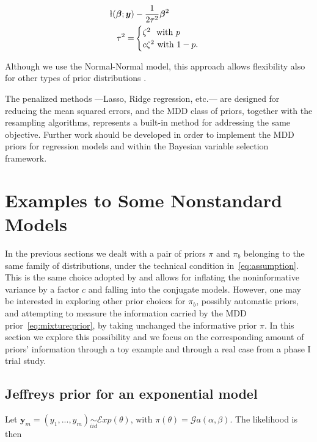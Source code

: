 \documentclass{statsoc}
\begin{document}
\begin{align}
\l(\bm{\beta}; \bm{y})& -\frac{1}{2\tau^{2}}\bm{\beta}^{2}\\
 \tau^{2}=&\begin{cases}
\zeta^{2} \ \  \mbox{with } p \\
c\zeta^{2}  \ \mbox{with } 1-p.
\end{cases}
\label{eq:penalized_hierarchical2}
\end{align}

Although we use the Normal-Normal model, this approach allows flexibility also for other types of prior distributions \citep{wood2017generalized}.

The penalized methods ---Lasso, Ridge regression, etc.--- are designed for reducing the mean squared errors, and the MDD class of priors, together with the resampling algorithms, represents a built-in method for addressing the same objective. Further work should be developed in order to implement the MDD priors for regression models and within the Bayesian variable selection framework.



\section{Examples to Some Nonstandard Models}
\label{sec:case}

In the previous sections we dealt with a pair of priors $\pi$ and $\pi_{b}$ belonging to the same family of distributions, under the technical condition in~\eqref{eq:assumption}. This is the same choice adopted by \cite{morita2008determining} and allows for inflating the noninformative variance by a factor $c$ and falling into the conjugate models. However, one may be interested in exploring other prior choices for $\pi_{b}$, possibly automatic priors, and attempting to measure the information carried by the MDD prior~\eqref{eq:mixture:prior}, by taking unchanged the informative prior $\pi$. In this section we explore this possibility and we focus on the corresponding amount of priors' information through a toy example and through a real case from a phase I trial study.

\subsection{Jeffreys prior for an exponential model}
\label{sec:Jeffreys_exp}

Let $\bm{y}_{m}=(y_{1},..., y_{m}) \underset{iid}{\sim} \mathcal{E}xp(\theta)$, with $\pi(\theta)= \mathcal{G}a(\alpha,\beta)$. The likelihood is then
\end{document}
